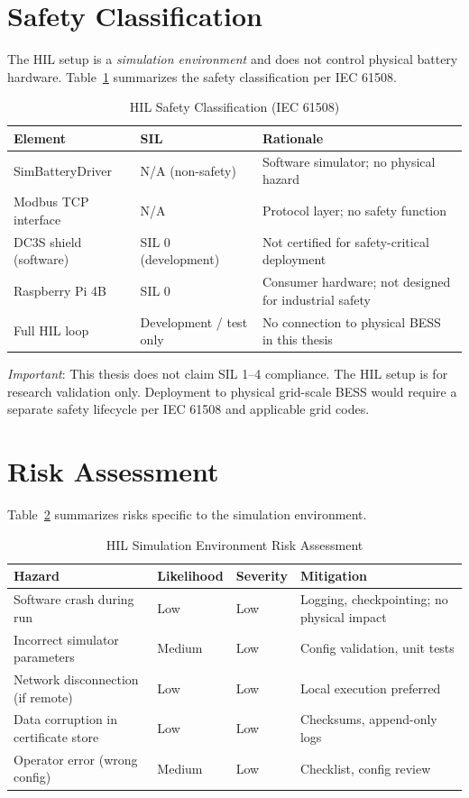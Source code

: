 \section{Safety Classification}

The HIL setup is a \emph{simulation environment} and does not control physical battery hardware. Table~\ref{tab:hil-safety-class} summarizes the safety classification per IEC 61508.

\begin{table}[htbp]
\centering
\caption{HIL Safety Classification (IEC 61508)}
\label{tab:hil-safety-class}
\begin{tabular}{@{}llp{5cm}@{}}
\toprule
\textbf{Element} & \textbf{SIL} & \textbf{Rationale} \\
\midrule
SimBatteryDriver & N/A (non-safety) & Software simulator; no physical hazard \\
Modbus TCP interface & N/A & Protocol layer; no safety function \\
DC3S shield (software) & SIL 0 (development) & Not certified for safety-critical deployment \\
Raspberry Pi 4B & SIL 0 & Consumer hardware; not designed for industrial safety \\
Full HIL loop & Development / test only & No connection to physical BESS in this thesis \\
\bottomrule
\end{tabular}
\end{table}

\emph{Important}: This thesis does not claim SIL 1--4 compliance. The HIL setup is for research validation only. Deployment to physical grid-scale BESS would require a separate safety lifecycle per IEC 61508 and applicable grid codes.

\section{Risk Assessment}

Table~\ref{tab:hil-risk} summarizes risks specific to the simulation environment.

\begin{table}[htbp]
\centering
\caption{HIL Simulation Environment Risk Assessment}
\label{tab:hil-risk}
\begin{tabular}{@{}lllp{3.5cm}@{}}
\toprule
\textbf{Hazard} & \textbf{Likelihood} & \textbf{Severity} & \textbf{Mitigation} \\
\midrule
Software crash during run & Low & Low & Logging, checkpointing; no physical impact \\
Incorrect simulator parameters & Medium & Low & Config validation, unit tests \\
Network disconnection (if remote) & Low & Low & Local execution preferred \\
Data corruption in certificate store & Low & Low & Checksums, append-only logs \\
Operator error (wrong config) & Medium & Low & Checklist, config review \\
\bottomrule
\end{tabular}
\end{table}

